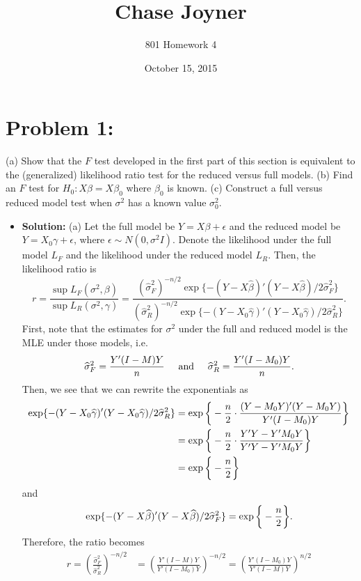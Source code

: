 \documentclass[11pt]{article}
\title{Chase Joyner}
\author{801 Homework 4}
\date{October 15, 2015}
\begin{document}
\maketitle
\section*{Problem 1:}  (a)  Show that the $F$ test developed in the first part of this section is equivalent to the (generalized) likelihood ratio test for the reduced versus full models.  (b)  Find an $F$ test for $H_0\colon X\beta = X\beta_0$ where $\beta_0$ is known.  (c)  Construct a full versus reduced model test when $\sigma^2$ has a known value $\sigma_0^2$.
\begin{itemize}
\item[] {\bf Solution:} (a)  Let the full model be $Y = X\beta + \epsilon$ and the reduced model be $Y = X_0\gamma + \epsilon$, where $\epsilon \sim N(0,\sigma^2I)$.  Denote the likelihood under the full model $L_F$ and the likelihood under the reduced model $L_R$.  Then, the likelihood ratio is
\[
r = \frac{\sup L_F(\sigma^2,\beta)}{\sup L_R(\sigma^2,\gamma)} = \frac{(\widehat{\sigma}^2_F)^{-n/2}\exp\{-(Y-X\widehat{\beta})'(Y-X\widehat{\beta})/2\widehat{\sigma}^2_F\}}{(\widehat{\sigma}^2_R)^{-n/2}\exp\{-(Y-X_0\widehat{\gamma})'(Y-X_0\widehat{\gamma})/2\widehat{\sigma}^2_R\}}.
\]
First, note that the estimates for $\sigma^2$ under the full and reduced model is the MLE under those models, i.e.
\[
\widehat{\sigma}^2_F = \frac{Y'(I-M)Y}{n} \hspace{5mm}\text{and}\hspace{5mm} \widehat{\sigma}^2_R = \frac{Y'(I-M_0)Y}{n}.
\]
Then, we see that we can rewrite the exponentials as
\begin{align*}
\exp\{-(Y-X_0\widehat{\gamma})'(Y-X_0\widehat{\gamma})/2\widehat{\sigma}^2_R\} &= \exp\bigg{\{}-\frac{n}{2}\cdot\frac{(Y-M_0Y)'(Y-M_0Y)}{Y'(I-M_0)Y} \bigg{\}} \\
&= \exp\bigg{\{}-\frac{n}{2}\cdot\frac{Y'Y - Y'M_0Y}{Y'Y-Y'M_0Y} \bigg{\}} \\
&= \exp\bigg{\{} -\frac{n}{2} \bigg{\}}
\end{align*}
and
\[
\exp\{-(Y-X\widehat{\beta})'(Y-X\widehat{\beta})/2\widehat{\sigma}^2_F\} = \exp\bigg{\{} -\frac{n}{2}\bigg{\}}.
\]
Therefore, the ratio becomes 
\begin{align*}
r = \left(\frac{\widehat{\sigma}^2_F}{\widehat{\sigma}^2_R}\right)^{-n/2} &= \left( \frac{Y'(I-M)Y}{Y'(I-M_0)Y} \right)^{-n/2} = \left( \frac{Y'(I-M_0)Y}{Y'(I-M)Y} \right)^{n/2} \\

\end{align*}
\end{itemize}
\end{document}
